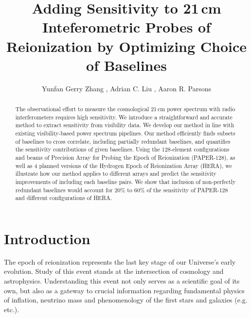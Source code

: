\documentclass[twocolumn,apj,numberedappendix]{emulateapj}
\renewcommand\[{\begin{equation}}
\renewcommand\]{\end{equation}}
\begin{document}
\title{Adding Sensitivity to 21\,cm Inteferometric Probes of Reionization by Optimizing Choice of Baselines}

\author{
Yunfan Gerry Zhang ,
Adrian C. Liu ,
Aaron R. Parsons
}


\begin{abstract}
The observational effort to measure the cosmological 21\,cm power spectrum with radio interferometers requires high sensitivity. We introduce a straightforward and accurate method to extract sensitivity from visibility data. We develop our method in line with existing visibility-based power spectrum pipelines. Our method efficiently finds subsets of baselines to cross correlate, including partially redundant baselines, and quantifies the sensitivity contributions of given baselines. 
Using the 128-element configurations and beams of Precision Array for Probing the Epoch of Reionization (PAPER-128), as well as 4 planned versions of the Hydrogen Epoch of Reionization Array (HERA), we illustrate how our method applies to different arrays and predict the sensitivity improvements of including each baseline pairs. We show that inclusion of non-perfectly redundant baselines 
would account for $20\%$ to $60\%$ of the sensitivity of PAPER-128 and different configurations of HERA. 
\end{abstract}

\section{Introduction}

The epoch of reionization represents the last key
stage of our Universe's early evolution. Study of this event stands at
the intersection of cosmology and astrophysics. Understanding this
event not only serves as a scientific goal
of its own, but also as a gateway to crucial information
regarding fundamental physics of inflation, neutrino mass and phenomenology
of the first stars and galaxies (e.g. \citealt{LiuOpticalDepth, Liu2016b, Mao2008, DEw21cm, Bull2015, Oyama20131186} etc.). 
\end{document}
